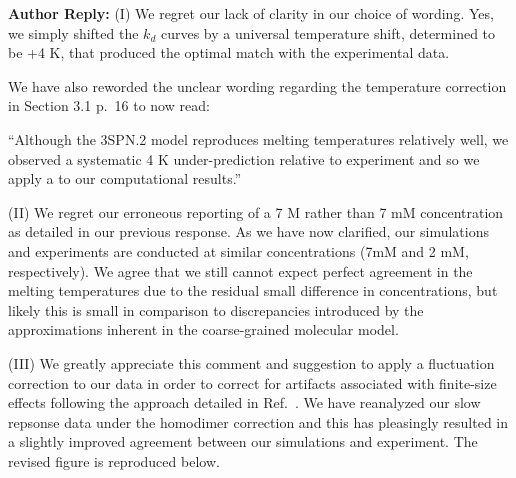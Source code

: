 \documentclass[11pt,a4paper]{letter} %
\newcommand*{\rood}[1]{{\color{red}{#1}}}
\begin{document}
\textbf{Author Reply:}   (I) We regret our lack of clarity in our choice of wording. Yes, we simply shifted the $k_d$ curves by a universal temperature shift, determined to be +4 K, that produced the optimal match with the experimental data. 

We have also reworded the unclear wording regarding the temperature correction in Section 3.1 p.~16 to now read:

``Although the 3SPN.2 model reproduces melting temperatures relatively well, we observed a systematic 4 K under-prediction relative to experiment and so we apply a \rood{universal (+4) K corrective temperature shift} to our computational results.''

(II) We regret our erroneous reporting of a 7 M rather than 7 mM concentration as detailed in our previous response. As we have now clarified, our simulations and experiments are conducted at similar concentrations (7mM and 2 mM, respectively). We agree that we still cannot expect perfect agreement in the melting temperatures due to the residual small  difference in concentrations, but likely this is small in comparison to discrepancies introduced by the approximations inherent in the coarse-grained molecular model.

(III) We greatly appreciate this comment and suggestion to apply a fluctuation correction to our data in order to correct for artifacts associated with finite-size effects following the approach detailed in Ref.~\citep{Ouldridge2010ExtractingSimulations}. We have reanalyzed our slow repsonse data under the homodimer correction and this has pleasingly resulted in a slightly improved agreement between our simulations and experiment. The revised figure is reproduced below. 
\end{document}
